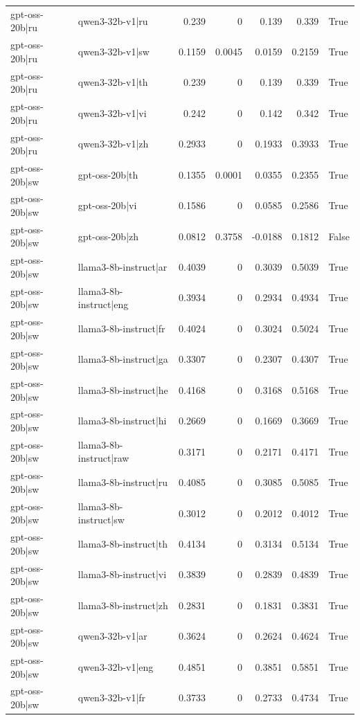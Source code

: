 \begin{table}
\begin{tabular}{l l r r r r l}
gpt-oss-20b|ru & qwen3-32b-v1|ru & 0.239 & 0 & 0.139 & 0.339 & True \\
gpt-oss-20b|ru & qwen3-32b-v1|sw & 0.1159 & 0.0045 & 0.0159 & 0.2159 & True \\
gpt-oss-20b|ru & qwen3-32b-v1|th & 0.239 & 0 & 0.139 & 0.339 & True \\
gpt-oss-20b|ru & qwen3-32b-v1|vi & 0.242 & 0 & 0.142 & 0.342 & True \\
gpt-oss-20b|ru & qwen3-32b-v1|zh & 0.2933 & 0 & 0.1933 & 0.3933 & True \\
gpt-oss-20b|sw & gpt-oss-20b|th & 0.1355 & 0.0001 & 0.0355 & 0.2355 & True \\
gpt-oss-20b|sw & gpt-oss-20b|vi & 0.1586 & 0 & 0.0585 & 0.2586 & True \\
gpt-oss-20b|sw & gpt-oss-20b|zh & 0.0812 & 0.3758 & -0.0188 & 0.1812 & False \\
gpt-oss-20b|sw & llama3-8b-instruct|ar & 0.4039 & 0 & 0.3039 & 0.5039 & True \\
gpt-oss-20b|sw & llama3-8b-instruct|eng & 0.3934 & 0 & 0.2934 & 0.4934 & True \\
gpt-oss-20b|sw & llama3-8b-instruct|fr & 0.4024 & 0 & 0.3024 & 0.5024 & True \\
gpt-oss-20b|sw & llama3-8b-instruct|ga & 0.3307 & 0 & 0.2307 & 0.4307 & True \\
gpt-oss-20b|sw & llama3-8b-instruct|he & 0.4168 & 0 & 0.3168 & 0.5168 & True \\
gpt-oss-20b|sw & llama3-8b-instruct|hi & 0.2669 & 0 & 0.1669 & 0.3669 & True \\
gpt-oss-20b|sw & llama3-8b-instruct|raw & 0.3171 & 0 & 0.2171 & 0.4171 & True \\
gpt-oss-20b|sw & llama3-8b-instruct|ru & 0.4085 & 0 & 0.3085 & 0.5085 & True \\
gpt-oss-20b|sw & llama3-8b-instruct|sw & 0.3012 & 0 & 0.2012 & 0.4012 & True \\
gpt-oss-20b|sw & llama3-8b-instruct|th & 0.4134 & 0 & 0.3134 & 0.5134 & True \\
gpt-oss-20b|sw & llama3-8b-instruct|vi & 0.3839 & 0 & 0.2839 & 0.4839 & True \\
gpt-oss-20b|sw & llama3-8b-instruct|zh & 0.2831 & 0 & 0.1831 & 0.3831 & True \\
gpt-oss-20b|sw & qwen3-32b-v1|ar & 0.3624 & 0 & 0.2624 & 0.4624 & True \\
gpt-oss-20b|sw & qwen3-32b-v1|eng & 0.4851 & 0 & 0.3851 & 0.5851 & True \\
gpt-oss-20b|sw & qwen3-32b-v1|fr & 0.3733 & 0 & 0.2733 & 0.4734 & True \\

\end{tabular}
\end{table}
